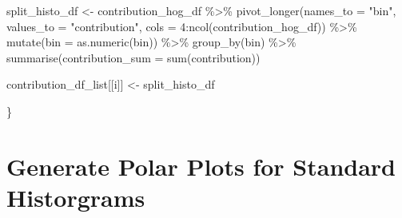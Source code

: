 \documentclass[
  letterpaper,
]{report}
\newenvironment{Shaded}{\begin{snugshade}}{\end{snugshade}}
\newcommand{\AttributeTok}[1]{\textcolor[rgb]{0.40,0.45,0.13}{#1}}
\newcommand{\DecValTok}[1]{\textcolor[rgb]{0.68,0.00,0.00}{#1}}
\newcommand{\FunctionTok}[1]{\textcolor[rgb]{0.28,0.35,0.67}{#1}}
\newcommand{\NormalTok}[1]{\textcolor[rgb]{0.00,0.23,0.31}{#1}}
\newcommand{\OtherTok}[1]{\textcolor[rgb]{0.00,0.23,0.31}{#1}}
\newcommand{\SpecialCharTok}[1]{\textcolor[rgb]{0.37,0.37,0.37}{#1}}
\newcommand{\StringTok}[1]{\textcolor[rgb]{0.13,0.47,0.30}{#1}}
\begin{document}
\begin{Shaded}
\begin{Highlighting}[]
\NormalTok{  split\_histo\_df }\OtherTok{\textless{}{-}} 
\NormalTok{    contribution\_hog\_df }\SpecialCharTok{\%\textgreater{}\%}
    \FunctionTok{pivot\_longer}\NormalTok{(}\AttributeTok{names\_to =} \StringTok{"bin"}\NormalTok{, }
                 \AttributeTok{values\_to =} \StringTok{"contribution"}\NormalTok{, }
                 \AttributeTok{cols =} \DecValTok{4}\SpecialCharTok{:}\FunctionTok{ncol}\NormalTok{(contribution\_hog\_df)) }\SpecialCharTok{\%\textgreater{}\%}
    \FunctionTok{mutate}\NormalTok{(}\AttributeTok{bin =} \FunctionTok{as.numeric}\NormalTok{(bin)) }\SpecialCharTok{\%\textgreater{}\%}
    \FunctionTok{group\_by}\NormalTok{(bin) }\SpecialCharTok{\%\textgreater{}\%}
    \FunctionTok{summarise}\NormalTok{(}\AttributeTok{contribution\_sum =} \FunctionTok{sum}\NormalTok{(contribution))}
  
  
\NormalTok{  contribution\_df\_list[[i]] }\OtherTok{\textless{}{-}}\NormalTok{ split\_histo\_df}

\NormalTok{\}}
\end{Highlighting}
\end{Shaded}

\hypertarget{generate-polar-plots-for-standard-historgrams}{%
\section{Generate Polar Plots for Standard
Historgrams}\label{generate-polar-plots-for-standard-historgrams}}
\end{document}
